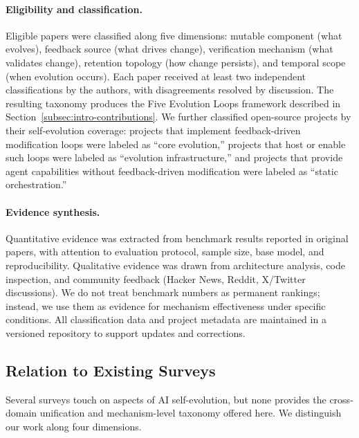 \paragraph{Eligibility and classification.} Eligible papers were classified along five dimensions: mutable component (what evolves), feedback source (what drives change), verification mechanism (what validates change), retention topology (how change persists), and temporal scope (when evolution occurs). Each paper received at least two independent classifications by the authors, with disagreements resolved by discussion. The resulting taxonomy produces the Five Evolution Loops framework described in Section~\ref{subsec:intro-contributions}. We further classified open-source projects by their self-evolution coverage: projects that implement feedback-driven modification loops were labeled as ``core evolution,'' projects that host or enable such loops were labeled as ``evolution infrastructure,'' and projects that provide agent capabilities without feedback-driven modification were labeled as ``static orchestration.''

\paragraph{Evidence synthesis.} Quantitative evidence was extracted from benchmark results reported in original papers, with attention to evaluation protocol, sample size, base model, and reproducibility. Qualitative evidence was drawn from architecture analysis, code inspection, and community feedback (Hacker News, Reddit, X/Twitter discussions). We do not treat benchmark numbers as permanent rankings; instead, we use them as evidence for mechanism effectiveness under specific conditions. All classification data and project metadata are maintained in a versioned repository to support updates and corrections.

\subsection{Relation to Existing Surveys}
\label{subsec:intro-survey-comparison}

Several surveys touch on aspects of AI self-evolution, but none provides the cross-domain unification and mechanism-level taxonomy offered here. We distinguish our work along four dimensions.

